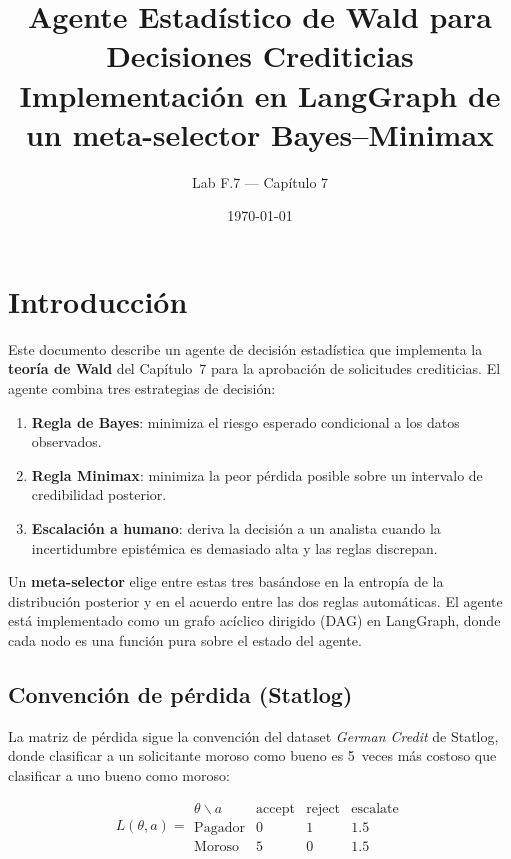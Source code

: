 \documentclass[11pt,a4paper]{article}
\title{\textbf{Agente Estadístico de Wald para Decisiones Crediticias}\\{\large Implementación en LangGraph de un meta-selector Bayes--Minimax}}
\author{Lab F.7 — Capítulo 7}
\date{\today}
\theoremstyle{definition}
\begin{document}
\maketitle

\tableofcontents
\newpage

\section{Introducción}

Este documento describe un agente de decisión estadística que implementa la
\textbf{teoría de Wald} del Capítulo~7 para la aprobación de solicitudes
crediticias. El agente combina tres estrategias de decisión:

\begin{enumerate}
	\item \textbf{Regla de Bayes}: minimiza el riesgo esperado condicional a los
	      datos observados.
	\item \textbf{Regla Minimax}: minimiza la peor pérdida posible sobre un
	      intervalo de credibilidad posterior.
	\item \textbf{Escalación a humano}: deriva la decisión a un analista cuando
	      la incertidumbre epistémica es demasiado alta y las reglas discrepan.
\end{enumerate}

Un \textbf{meta-selector} elige entre estas tres basándose en la entropía de
la distribución posterior y en el acuerdo entre las dos reglas automáticas.
El agente está implementado como un grafo acíclico dirigido (DAG) en
LangGraph, donde cada nodo es una función pura sobre el estado del agente.

\subsection*{Convención de pérdida (Statlog)}

La matriz de pérdida sigue la convención del dataset \emph{German Credit}
de Statlog, donde clasificar a un solicitante moroso como bueno es 5~veces
más costoso que clasificar a uno bueno como moroso:

\begin{equation}\label{eq:loss-matrix}
	L(\theta,a) =
	\begin{array}{c|ccc}
		\theta \backslash a & \text{accept} & \text{reject} & \text{escalate} \\ \hline
		\text{Pagador}         & 0             & 1             & 1.5             \\
		\text{Moroso}          & 5             & 0             & 1.5
	\end{array}
\end{equation}
\end{document}
